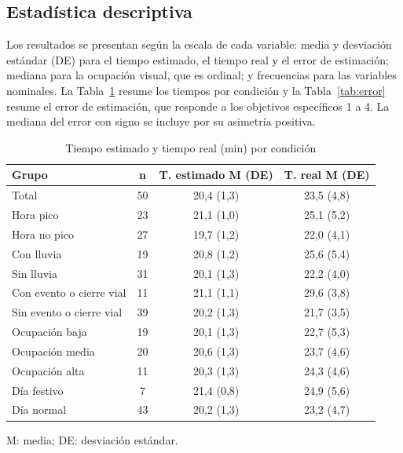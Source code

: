 \subsection{Estadística descriptiva}

Los resultados se presentan según la escala de cada variable: media y desviación estándar (DE) para el tiempo estimado, el tiempo real y el error de estimación; mediana para la ocupación visual, que es ordinal; y frecuencias para las variables nominales. La Tabla~\ref{tab:tiempos} resume los tiempos por condición y la Tabla~\ref{tab:error} resume el error de estimación, que responde a los objetivos específicos 1 a 4. La mediana del error con signo se incluye por su asimetría positiva.

\begin{table}[H]
\centering
\caption{Tiempo estimado y tiempo real (min) por condición}
\label{tab:tiempos}
\small
\begin{tabular}{@{}l c c c@{}}
\toprule
\textbf{Grupo} & \textbf{n} & \textbf{T. estimado M (DE)} & \textbf{T. real M (DE)} \\
\midrule
Total & 50 & 20,4 (1,3) & 23,5 (4,8) \\
\midrule
Hora pico & 23 & 21,1 (1,0) & 25,1 (5,2) \\
Hora no pico & 27 & 19,7 (1,2) & 22,0 (4,1) \\
\midrule
Con lluvia & 19 & 20,8 (1,2) & 25,6 (5,4) \\
Sin lluvia & 31 & 20,1 (1,3) & 22,2 (4,0) \\
\midrule
Con evento o cierre vial & 11 & 21,1 (1,1) & 29,6 (3,8) \\
Sin evento o cierre vial & 39 & 20,2 (1,3) & 21,7 (3,5) \\
\midrule
Ocupación baja & 19 & 20,1 (1,3) & 22,7 (5,3) \\
Ocupación media & 20 & 20,6 (1,3) & 23,7 (4,6) \\
Ocupación alta & 11 & 20,3 (1,3) & 24,3 (4,6) \\
\midrule
Día festivo & 7 & 21,4 (0,8) & 24,9 (5,6) \\
Día normal & 43 & 20,2 (1,3) & 23,2 (4,7) \\
\bottomrule
\end{tabular}

\vspace{2pt}
\footnotesize{M: media; DE: desviación estándar.}
\end{table}

